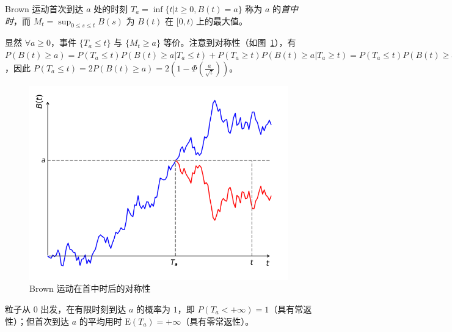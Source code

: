 \documentclass[../main.tex]{subfiles}
\begin{document}
Brown 运动首次到达 $a$ 处的时刻 $T_a=\inf\{t|t\geq0,B(t)=a\}$ 称为 $a$ 的\emph{首中时}，而 $M_t=\sup_{0\leq s\leq t}B(s)$ 为 $B(t)$ 在 $[0,t)$ 上的最大值。

显然 $\forall a\geq 0$，事件 $\{T_a\leq t\}$ 与 $\{M_t\geq a\}$ 等价。注意到对称性（如图~\ref{fig:8.3.1}），有 $P(B(t)\geq a)=P(T_a\leq t)P(B(t)\geq a|T_a\leq t)+P(T_a\geq t)P(B(t)\geq a|T_a\geq t)=P(T_a\leq t)P(B(t)\geq a|T_a\leq t)=\frac12P(T_a\leq t)$，因此 $P(T_a\leq t)=2P(B(t)\geq a)=2(1-\Phi(\frac a{\sqrt t}))$。

\begin{figure}[!h]
    \centering
    \includegraphics[scale=0.7]{figures/brownian_motion_symmetry.png}
    \caption{Brown 运动在首中时后的对称性}
    \label{fig:8.3.1}
\end{figure}

\begin{proposition}
    粒子从 $0$ 出发，在有限时刻到达 $a$ 的概率为 $1$，即 $P(T_a<+\infty)=1$（具有常返性）；但首次到达 $a$ 的平均用时 $\mathrm E(T_a)=+\infty$（具有零常返性）。
\end{proposition}
\end{document}
